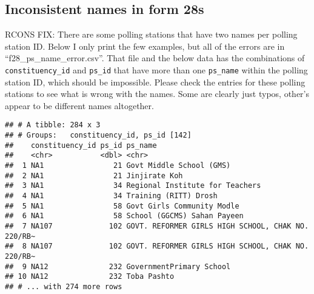 \documentclass[]{article}
\newenvironment{Shaded}{\begin{snugshade}}{\end{snugshade}}
\newcommand{\DecValTok}[1]{\textcolor[rgb]{0.00,0.00,0.81}{#1}}
\newcommand{\KeywordTok}[1]{\textcolor[rgb]{0.13,0.29,0.53}{\textbf{#1}}}
\newcommand{\NormalTok}[1]{#1}
\newcommand{\OperatorTok}[1]{\textcolor[rgb]{0.81,0.36,0.00}{\textbf{#1}}}
\newcommand{\StringTok}[1]{\textcolor[rgb]{0.31,0.60,0.02}{#1}}
\begin{document}
\hypertarget{inconsistent-names-in-form-28s}{%
\subsection{Inconsistent names in form
28s}\label{inconsistent-names-in-form-28s}}

RCONS FIX: There are some polling stations that have two names per
polling station ID. Below I only print the few examples, but all of the
errors are in ``f28\_ps\_name\_error.csv''. That file and the below data
has the combinations of \texttt{constituency\_id} and \texttt{ps\_id}
that have more than one \texttt{ps\_name} within the polling station ID,
which should be impossible. Please check the entries for these polling
stations to see what is wrong with the names. Some are clearly just
typos, other's appear to be different names altogether.

\begin{Shaded}
\end{Shaded}

\begin{verbatim}
## # A tibble: 284 x 3
## # Groups:   constituency_id, ps_id [142]
##    constituency_id ps_id ps_name                                           
##    <chr>           <dbl> <chr>                                             
##  1 NA1                21 Govt Middle School (GMS)                          
##  2 NA1                21 Jinjirate Koh                                     
##  3 NA1                34 Regional Institute for Teachers                   
##  4 NA1                34 Training (RITT) Drosh                             
##  5 NA1                58 Govt Girls Community Modle                        
##  6 NA1                58 School (GGCMS) Sahan Payeen                       
##  7 NA107             102 GOVT. REFORMER GIRLS HIGH SCHOOL, CHAK NO. 220/RB~
##  8 NA107             102 GOVT. REFORMER GIRLS HIGH SCHOOL, CHAK NO. 220/RB~
##  9 NA12              232 GovernmentPrimary School                          
## 10 NA12              232 Toba Pashto                                       
## # ... with 274 more rows
\end{verbatim}
\end{document}
